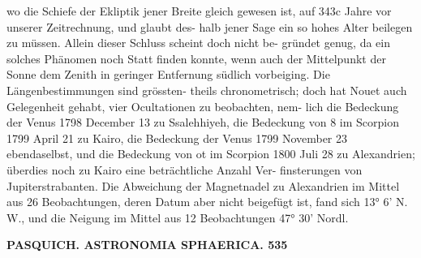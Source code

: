 \documentclass[12pt,a4paper]{article}
\begin{document}
wo  die  Schiefe der  Ekliptik  jener  Breite  gleich  gewesen  ist,  auf  343c  Jahre  vor  unserer  Zeitrechnung,  und  glaubt  des- halb jener  Sage  ein  so  hohes  Alter  beilegen  zu  müssen.  Allein  dieser  Schluss  scheint  doch  nicht  be- gründet genug,  da  ein  solches  Phänomen  noch  Statt  finden  konnte,  wenn  auch  der  Mittelpunkt  der Sonne  dem  Zenith  in  geringer  Entfernung  südlich  vorbeiging.  Die  Längenbestimmungen  sind  grössten- theils  chronometrisch;  doch  hat  Nouet  auch  Gelegenheit  gehabt,  vier  Ocultationen  zu  beobachten,  nem- lich  die  Bedeckung  der  Venus  1798  December  13  zu  Ssalehhiyeh,  die  Bedeckung  von  8  im  Scorpion 1799  April  21  zu  Kairo,  die  Bedeckung  der  Venus  1799  November  23  ebendaselbst,  und  die  Bedeckung von  ot  im  Scorpion  1800  Juli  28  zu  Alexandrien;  überdies  noch  zu  Kairo  eine  beträchtliche  Anzahl  Ver- finsterungen von  Jupiterstrabanten.  Die  Abweichung  der  Magnetnadel  zu  Alexandrien  im  Mittel  aus 26  Beobachtungen,  deren  Datum  aber  nicht  beigefügt  ist,  fand  sich  13°  6'  N.  W.,  und  die  Neigung  im Mittel  aus  12  Beobachtungen  47°  30'  Nordl.

\vspace{0.5em}


\noindent\textbf{PASQUICH.     ASTRONOMIA  SPHAERICA.  535}
\end{document}
